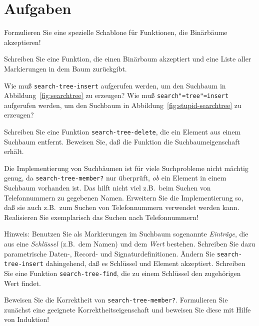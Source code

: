 \section*{Aufgaben}

\begin{aufgabe}
  \label{ex:recipe-trees}
  Formulieren Sie eine spezielle Schablone für Funktionen, die
  Binärbäume akzeptieren!
\end{aufgabe}

\begin{aufgabe}
  Schreiben Sie eine Funktion, die einen Binärbaum akzeptiert
  und eine Liste aller Markierungen in dem Baum zurückgibt.
\end{aufgabe}

\begin{aufgabe}
  Wie muß \texttt{search-tree-insert} aufgerufen werden, um den
  Suchbaum in Abbildung~\ref{fig:searchtree} zu erzeugen?  Wie muß
  \texttt{search"=tree"=insert} aufgerufen werden, um den Suchbaum in
  Abbildung~\ref{fig:stupid-searchtree} zu erzeugen?
\end{aufgabe}

\begin{aufgabe}
  Schreiben Sie eine Funktion \texttt{search-tree-delete}, die ein
  Element aus einem Suchbaum entfernt.  Beweisen Sie, daß die Funktion die
  Suchbaumeigenschaft erhält.
\end{aufgabe}

\begin{aufgabe}
  Die Implementierung von Suchbäumen ist für viele Suchprobleme nicht
  mächtig genug, da \texttt{search-tree-member?} nur überprüft,
  \emph{ob} ein Element in einem Suchbaum vorhanden ist.  Das hilft
  nicht viel z.B.\ beim Suchen von Telefonnummern zu gegebenen Namen.
  Erweitern Sie die Implementierung so, daß sie auch z.B.\ zum Suchen
  von Telefonnummern verwendet werden kann.  Realisieren Sie
  exemplarisch das Suchen nach Telefonnummern!

  Hinweis: Benutzen Sie als Markierungen im Suchbaum sogenannte
  \textit{Einträge}, die aus eine \textit{Schlüssel} (z.B.\ dem Namen)
  und dem \textit{Wert} bestehen.  Schreiben Sie dazu parametrische Daten-,
  Record- und Signaturdefinitionen. Ändern Sie \texttt{search-tree-insert}
  dahingehend, daß es Schlüssel und Element akzeptiert.  Schreiben Sie eine
  Funktion \texttt{search-tree-find}, die zu einem Schlüssel den
  zugehörigen Wert findet.
\end{aufgabe}

\begin{aufgabe}
  Beweisen Sie die Korrektheit von \texttt{search-tree-member?}.
  Formulieren Sie zunächst eine geeignete Korrektheitseigenschaft und
  beweisen Sie diese mit Hilfe von Induktion!
\end{aufgabe}

